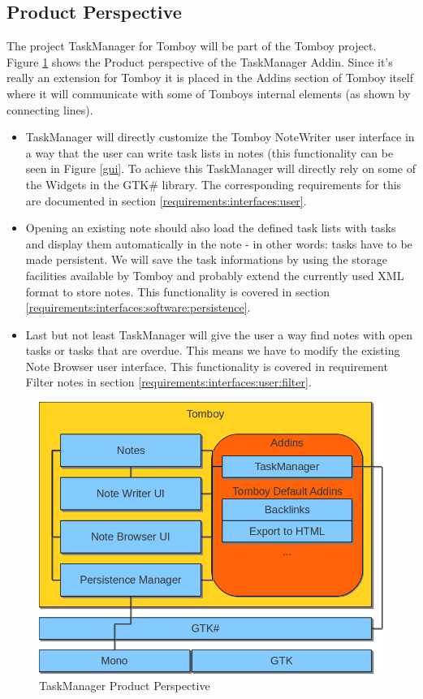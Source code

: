\subsection{Product Perspective}
\label{description:perspective}
  The project TaskManager for Tomboy will be part of the Tomboy project.\\
  Figure \ref{perspective} shows the Product perspective of the TaskManager Addin. Since it's really an extension for Tomboy it is placed in
  the Addins section of Tomboy itself where it will communicate with some of Tomboys internal elements (as shown by connecting lines).
  \begin{itemize}
    \item TaskManager will directly customize the Tomboy NoteWriter user interface in a way that the user can write task lists in notes 
	(this functionality can be seen in Figure \ref{gui}. To achieve this TaskManager will  directly rely on some of the 
	Widgets in the GTK\# library. The corresponding requirements for this are documented in section \ref{requirements:interfaces:user}.
    \item Opening an existing note should also load the defined task lists with tasks and display them automatically in the note - in other words:
    tasks have to be made persistent.
	We  will save the task informations by using the storage facilities available by Tomboy and probably extend
    the currently used XML format to store notes. This functionality is covered in section \ref{requirements:interfaces:software:persistence}.
    \item Last but not least TaskManager will give the user a way find notes with open tasks or tasks that are overdue. This means we have to modify
    the existing Note Browser user interface. This functionality is covered in requirement Filter notes in section \ref{requirements:interfaces:user:filter}.
  \end{itemize}


  \begin{figure}[ht]
    \includegraphics[width=\textwidth]{graphics/product_perspective_diagram.png}
    \caption{TaskManager Product Perspective}
    \label{perspective}
  \end{figure}


